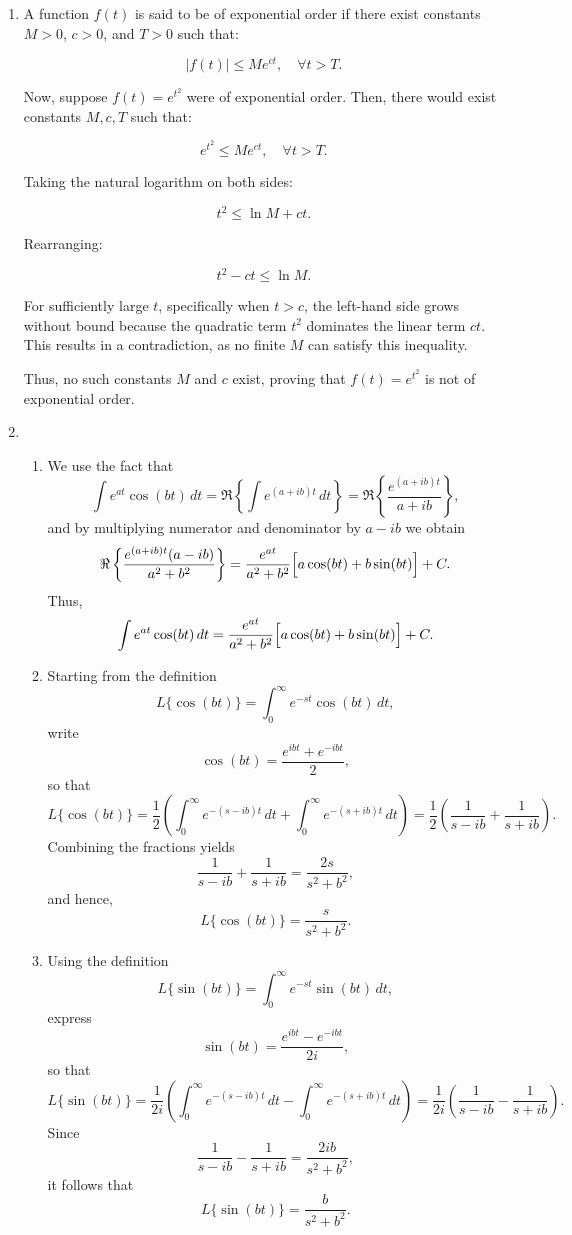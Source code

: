 \documentclass[12pt]{article}
\begin{document}
\begin{enumerate}
\item 
A function \( f(t) \) is said to be of exponential order if there exist constants \( M > 0 \), \( c > 0 \), and \( T > 0 \) such that:

\[
|f(t)| \leq M e^{ct}, \quad \forall t > T.
\]

Now, suppose \( f(t) = e^{t^2} \) were of exponential order. Then, there would exist constants \( M, c, T \) such that:

\[
e^{t^2} \leq M e^{ct}, \quad \forall t > T.
\]

Taking the natural logarithm on both sides:

\[
t^2 \leq \ln M + ct.
\]

Rearranging:

\[
t^2 - ct \leq \ln M.
\]

For sufficiently large \( t \), specifically when \( t > c \), the left-hand side grows without bound because the quadratic term \( t^2 \) dominates the linear term \( ct \). This results in a contradiction, as no finite \( M \) can satisfy this inequality. 

Thus, no such constants \( M \) and \( c \) exist, proving that \( f(t) = e^{t^2} \) is not of exponential order.

\item 
\begin{enumerate}[label=(\alph*)]
\item We use the fact that
\[
\int e^{at}\cos(bt)\,dt=\Re\left\{\int e^{(a+ib)t}\,dt\right\}=\Re\left\{\frac{e^{(a+ib)t}}{a+ib}\right\},
\]
and by multiplying numerator and denominator by \(a-ib\) we obtain
\[
\Re\left\{\frac{e^{(a+ib)t}(a-ib)}{a^2+b^2}\right\}=\frac{e^{at}}{a^2+b^2}\Bigl[a\cos(bt)+b\sin(bt)\Bigr]+C.
\]
Thus,
\[
\int e^{at}\cos(bt)\,dt=\frac{e^{at}}{a^2+b^2}\Bigl[a\cos(bt)+b\sin(bt)\Bigr]+C.
\]

\item Starting from the definition
\[
L\{\cos(bt)\}=\int_0^\infty e^{-st}\cos(bt)\,dt,
\]
write
\[
\cos(bt)=\frac{e^{ibt}+e^{-ibt}}{2},
\]
so that
\[
L\{\cos(bt)\}=\frac{1}{2}\left(\int_0^\infty e^{-(s-ib)t}\,dt+\int_0^\infty e^{-(s+ib)t}\,dt\right)
=\frac{1}{2}\left(\frac{1}{s-ib}+\frac{1}{s+ib}\right).
\]
Combining the fractions yields
\[
\frac{1}{s-ib}+\frac{1}{s+ib}=\frac{2s}{s^2+b^2},
\]
and hence,
\[
L\{\cos(bt)\}=\frac{s}{s^2+b^2}.
\]

\item Using the definition
\[
L\{\sin(bt)\}=\int_0^\infty e^{-st}\sin(bt)\,dt,
\]
express
\[
\sin(bt)=\frac{e^{ibt}-e^{-ibt}}{2i},
\]
so that
\[
L\{\sin(bt)\}=\frac{1}{2i}\left(\int_0^\infty e^{-(s-ib)t}\,dt-\int_0^\infty e^{-(s+ib)t}\,dt\right)
=\frac{1}{2i}\left(\frac{1}{s-ib}-\frac{1}{s+ib}\right).
\]
Since
\[
\frac{1}{s-ib}-\frac{1}{s+ib}=\frac{2ib}{s^2+b^2},
\]
it follows that
\[
L\{\sin(bt)\}=\frac{b}{s^2+b^2}.
\]


\end{enumerate}
\end{enumerate}
\end{document}
